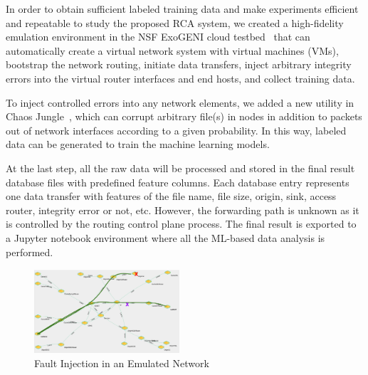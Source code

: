 In order to obtain sufficient labeled training data and make experiments efficient and repeatable to study the proposed RCA system, 
we created a high-fidelity emulation environment in the NSF ExoGENI cloud testbed~\cite{ExoGENI:web} that can automatically create a virtual network system with virtual machines (VMs), bootstrap the network routing, 
initiate data transfers, inject arbitrary integrity errors into the virtual router interfaces and end hosts, and collect training data.

To inject controlled errors into any network elements, we added a new utility in Chaos Jungle~\cite{swip:pearc:2019,chaosjungle:web}, which can corrupt arbitrary file(s) in nodes in addition to packets out of network interfaces according to a given probability. In this way, labeled data can be generated to train the machine learning models. 

At the last step, all the raw data will be processed and stored in the final result database files with predefined feature columns. Each database entry represents one data transfer with features of the file name, file size, origin, sink, access router, integrity error or not, etc. However, the forwarding path is unknown as it is controlled by the routing control plane process. The final result is exported to a Jupyter notebook environment where all the ML-based data analysis is performed.


\begin{figure}[!ht]
\begin{center}
\includegraphics[width=0.48\textwidth]{./figure/ChaosJungle}
\end{center}
\caption{Fault Injection in an Emulated Network}
\label{fig:topology}
\end{figure}

